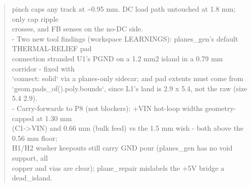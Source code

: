 \documentclass[11pt,a4paper]{article}
\begin{document}
\begin{quote}
  pinch caps any track at \textasciitilde{}0.95 mm. DC load path untouched at 1.8 mm; only cap ripple\\
  crosses, and FB senses on the no-DC side.\\
- Two new tool findings (workspace LEARNINGS): planes\_gen's default THERMAL-RELIEF pad\\
  connection stranded U1's PGND on a 1.2 mm2 island in a 0.79 mm corridor - fixed with\\
  `connect: solid` via a planes-only sidecar; and pad extents must come from\\
  `geom.pads\_of().poly.bounds`, since L1's land is 2.9 x 5.4, not the raw (size 5.4 2.9).\\
- Carry-forwards to P8 (not blockers): +VIN hot-loop widths geometry-capped at 1.30 mm\\
  (C1-\textgreater{}VIN) and 0.66 mm (bulk feed) vs the 1.5 mm wish - both above the 0.56 mm floor;\\
  H1/H2 washer keepouts still carry GND pour (planes\_gen has no void support, all\\
  copper and vias are clear); plane\_repair mislabels the +5V bridge a dead\_island.
\end{quote}
\end{document}
